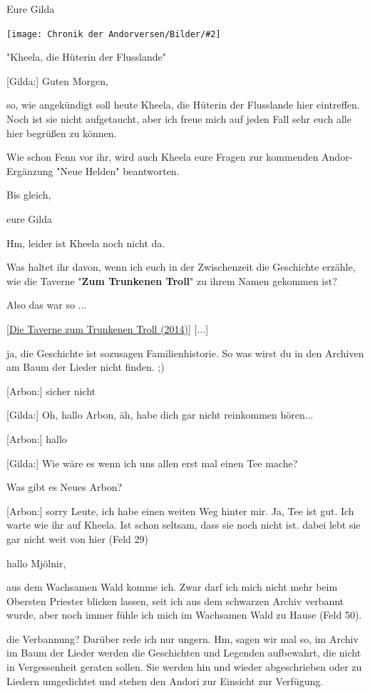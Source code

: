 \documentclass[10pt, a4paper, oneside]{book}
\newcommand{\refstorytext}[1]{\hyperref[Storytext: #1]{#1}}
\newcommand{\bildmitts}[2][height=0.32\textwidth,width=0.48\textwidth,keepaspectratio]{%
    \begin{center}
        \texttt{[image: Chronik der Andorversen/Bilder/\#2]}
    \end{center}
}
\begin{document}
\begin{multicols}{2}
Eure Gilda

\bildmitts{NH Taverne Kheela.jpg}

\begin{center}
    "Kheela, die Hüterin der Flusslande"
\end{center}

[Gilda:] Guten Morgen,

so, wie angekündigt soll heute Kheela, die Hüterin der Flusslande hier eintreffen. Noch ist sie nicht aufgetaucht, aber ich freue mich auf jeden Fall sehr euch alle hier begrüßen zu können.

Wie schon Fenn vor ihr, wird auch Kheela eure Fragen zur kommenden Andor-Ergänzung "Neue Helden" beantworten.

Bis gleich,

eure Gilda

Hm, leider ist Kheela noch nicht da.

Was haltet ihr davon, wenn ich euch in der Zwischenzeit die Geschichte erzähle, wie die Taverne "\textbf{Zum Trunkenen Troll}" zu ihrem Namen gekommen ist?

Also das war so ...

[\refstorytext{Die Taverne zum Trunkenen Troll (2014)}] [...]

ja, die Geschichte ist sozusagen Familienhistorie. So was wirst du in den Archiven am Baum der Lieder nicht finden. ;)

[Arbon:] sicher nicht

[Gilda:] Oh, hallo Arbon, äh, habe dich gar nicht reinkommen hören...

[Arbon:] hallo

[Gilda:] Wie wäre es wenn ich uns allen erst mal einen Tee mache?

Was gibt es Neues Arbon?

[Arbon:] sorry Leute, ich habe einen weiten Weg hinter mir. Ja, Tee ist gut. Ich warte wie ihr auf Kheela. Ist schon seltsam, dass sie noch nicht ist. dabei lebt sie gar nicht weit von hier (Feld 29)

hallo Mjölnir,

aus dem Wachsamen Wald komme ich. Zwar darf ich mich nicht mehr beim Obersten Priester blicken lassen, seit ich aus dem schwarzen Archiv verbannt wurde, aber noch immer fühle ich mich im Wachsamen Wald zu Hause (Feld 50).

die Verbannung? Darüber rede ich nur ungern. Hm, sagen wir mal so, im Archiv im Baum der Lieder werden die Geschichten und Legenden aufbewahrt, die nicht in Vergessenheit geraten sollen. Sie werden hin und wieder abgeschrieben oder zu Liedern umgedichtet und stehen den Andori zur Einsicht zur Verfügung.


\end{multicols}
\end{document}
